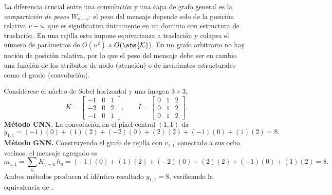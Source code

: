 La diferencia crucial entre una convoluci\'on y una capa de grafo general es la
\emph{compartici\'on de pesos} $W_{v-u}$: el peso del mensaje depende solo de la
posici\'on relativa $v-u$, que es significativa \'unicamente en un dominio con
estructura de traslaci\'on. En una rejilla esto impone equivarianza a traslaci\'on
y colapsa el n\'umero de par\'ametros de $O(n^2)$ a $O(\abs{\mathcal{K}})$. En un
grafo arbitrario no hay noci\'on de posici\'on relativa, por lo que el peso del
mensaje debe ser en cambio una funci\'on de los atributos de nodo (atenci\'on) o
de invariantes estructurales como el grado (convoluci\'on).

\begin{example}
\label{ex:graphs:sobel}
Consid\'erese el n\'ucleo de Sobel horizontal y una imagen $3 \times 3$,
\[
  K = \begin{bmatrix} -1 & 0 & 1 \\ -2 & 0 & 2 \\ -1 & 0 & 1 \end{bmatrix},
  \qquad
  I = \begin{bmatrix} 0 & 1 & 2 \\ 0 & 1 & 2 \\ 0 & 1 & 2 \end{bmatrix}.
\]
\textbf{M\'etodo CNN.} La convoluci\'on en el p\'ixel central $(1,1)$ da
\[
  y_{1,1} = (-1)(0) + (1)(2) + (-2)(0) + (2)(2) + (-1)(0) + (1)(2) = 8 .
\]
\textbf{M\'etodo GNN.} Construyendo el grafo de rejilla con $v_{1,1}$ conectado a
sus ocho vecinos, el mensaje agregado es
\[
  m_{1,1} = \sum_{u} K_{v-u}\, h_u
    = (-1)(0) + (1)(2) + (-2)(0) + (2)(2) + (-1)(0) + (1)(2) = 8 .
\]
Ambos m\'etodos producen el id\'entico resultado $y_{1,1} = 8$, verificando la
equivalencia de .
\end{example}

